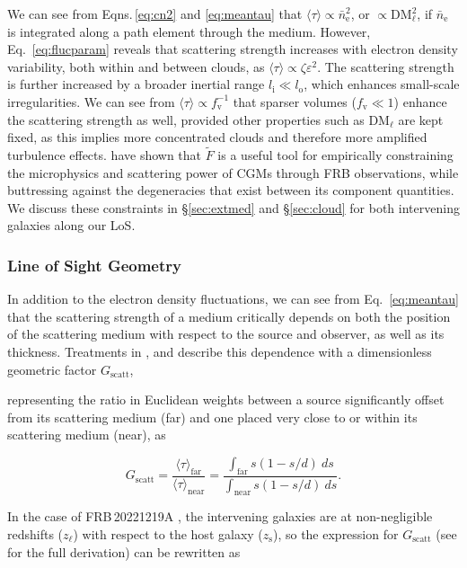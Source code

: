 \documentclass[twocolumn, linenumbers, tra]{aastex631}
\newcommand{\rev}[1]{{\color{purple}#1}}
\newcommand{\nihari}{FRB\,20221219A } %
\begin{document}
{We can see from Eqns.\,\ref{eq:cn2} and \ref{eq:meantau} that $\langle \tau \rangle \propto \bar{n}_{\mathrm{e}}^2$, or $\propto \mathrm{DM}_{\ell}^2$, if $\bar{n}_{\mathrm{e}}$ is integrated along a path element through the medium. However, Eq.~\ref{eq:flucparam} reveals that scattering strength increases with electron density variability, both within and between clouds, as $\langle \tau \rangle \propto \zeta \varepsilon^2$. The scattering strength is further increased by a broader inertial range $l_\mathrm{i} \ll l_\mathrm{o}$, which enhances small-scale irregularities. We can see from $\langle \tau \rangle \propto f_{\mathrm{v}}^{-1}$ that sparser volumes ($f_{\mathrm{v}} \ll 1$) enhance the scattering strength as well, provided other properties such as $\mathrm{DM}_\ell$ are kept fixed, as this implies more concentrated clouds and therefore more amplified turbulence effects. \citet{Ocker2025} have shown that $\widetilde{F}$ is a useful tool for empirically constraining the microphysics and scattering power of CGMs through FRB observations, while buttressing against the degeneracies that exist between its component quantities. We discuss these constraints in \S\ref{sec:extmed} and \S\ref{sec:cloud} for both intervening galaxies along our LoS.} %

\subsubsection{Line of Sight Geometry}\label{sec:scatgeo}

In addition to the electron density fluctuations, we can see from Eq.~\ref{eq:meantau} that the scattering strength of a medium critically depends on both the position of the scattering medium with respect to the source and observer, as well as its thickness. Treatments in \citet{Ocker2021}, and \citet{Cordes2022} describe this dependence with a dimensionless geometric factor $G_{\mathrm{scatt}}$, \rev{representing the ratio in Euclidean weights between a source significantly offset from its scattering medium (far) and one placed very close to or within its scattering medium (near), as

\begin{equation}
G_{\mathrm{scatt}} = \frac{\langle \tau \rangle_{\mathrm{far}}}{\langle \tau \rangle_{\mathrm{near}}} = \frac{\int_{\mathrm{far}} s(1-s/d)\ ds }{\int_{\mathrm{near}} s(1-s/d)\ ds}.
\end{equation}} %
\noindent

In the case of \nihari, the intervening galaxies are at non-negligible redshifts ($z_{\ell}$) with respect to the host galaxy ($z_{\mathrm{s}}$), so the expression for $G_{\mathrm{scatt}}$ (see \citet{Cordes2022} for the full derivation) can be rewritten as
\end{document}
